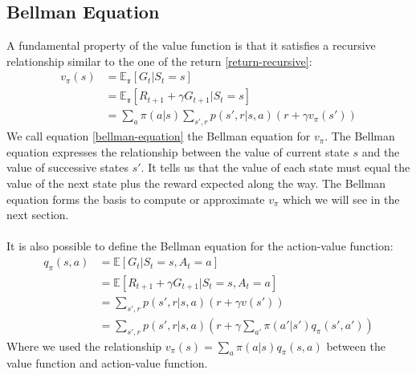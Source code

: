 \subsection{Bellman Equation}
A fundamental property of the value function is that it satisfies a recursive relationship similar to the one of the return \ref{return-recursive}:
\begin{equation}
    \begin{split}
        v_{\pi}(s) & = \mathds{E_{\pi}}[G_t | S_t = s] \\
        & = \mathds{E_{\pi}}[R_{t+1} + \gamma G_{t+1} | S_t = s] \\
        & = \sum_a \pi(a | s) \sum_{s', r} p(s', r | s, a) (r + \gamma v_{\pi}(s'))
    \end{split}
    \label{bellman-equation}
\end{equation}
We call equation \ref{bellman-equation} the Bellman equation for $v_{\pi}$. The Bellman equation expresses the relationship between the value of current state $s$ and the value of successive states $s'$. It tells us that the value of each state must equal the value of the next state plus the reward expected along the way. The Bellman equation forms the basis to compute or approximate $v_{\pi}$ which we will see in the next  section.\\\\
It is also possible to define the Bellman equation for the action-value function:
\begin{equation}
    \begin{split}
        q_{\pi}(s, a) & = \mathds{E}[G_t | S_t = s, A_t = a] \\
        & = \mathds{E}[R_{t+1} + \gamma G_{t+1} | S_t = s, A_t = a] \\
        & = \sum_{s', r} p(s', r | s, a) (r + \gamma v(s')) \\
        & = \sum_{s', r} p(s', r | s, a) (r + \gamma \sum_{a'} \pi(a' | s') q_{\pi}(s', a'))
    \end{split}
    \label{bellman-equation-action-value}
\end{equation}
Where we used the relationship $v_{\pi}(s) = \sum_a \pi(a | s) q_{\pi}(s, a)$ between the value function and action-value function.\\\\

